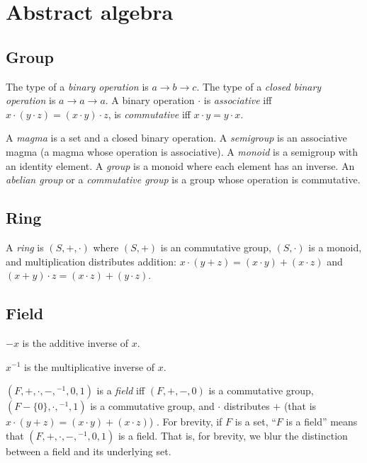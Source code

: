 \chapter{Abstract algebra}

\section{Group}

%
The type of a \emph{binary operation} is \(a \to b \to c\).
%
%
The type of a \emph{closed binary operation} is \(a \to a \to a\).
A binary operation \(\cdot\)
is \emph{associative} iff \(x\cdot(y\cdot z) = (x\cdot y)\cdot z\),
is \emph{commutative} iff \(x \cdot y = y \cdot x\).

%
A \emph{magma} is a set and a closed binary operation.
%
A \emph{semigroup} is an associative magma (a magma whose operation is associative).
%
A \emph{monoid} is a semigroup with an identity element.
%
A \emph{group} is a monoid where each element has an inverse.
%
%
%
%
An \emph{abelian group} or a \emph{commutative group}
is a group whose operation is commutative.

\section{Ring}

A \emph{ring} is \((S,+,\cdot)\) where
\((S,+)\) is an commutative group,
\((S,\cdot)\) is a monoid,
and multiplication distributes addition:
\(x \cdot (y+z) = (x \cdot y) + (x \cdot z)\)
and \((x+y) \cdot z = (x \cdot z) + (y \cdot z)\).

\section{Field}

\(-x\) is the additive inverse of \(x\).

\(x^{-1}\) is the multiplicative inverse of \(x\).

%
\((F,+,\cdot,-,{}^{-1},0,1)\) is a \emph{field} iff
\((F,+,-,0)\) is a commutative group,
\((F-\{0\},\cdot,{}^{-1},1)\) is a commutative group,
and \(\cdot\) distributes \(+\) (that is \(x \cdot (y + z) = (x \cdot y) + (x \cdot z)\)) \cite{wpfield}.
For brevity, if \(F\) is a set, ``\(F\) is a field'' means that \((F,+,\cdot,-,{}^{-1},0,1)\) is a field.
That is, for brevity, we blur the distinction between a field and its underlying set.
